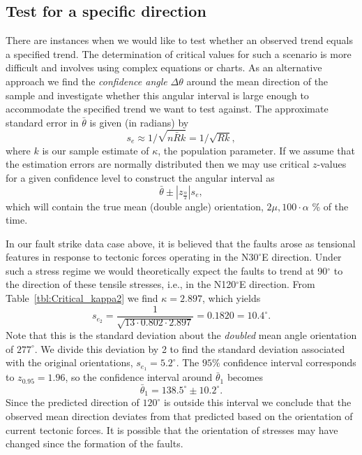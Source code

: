 \subsection{Test for a specific direction}

	There are instances when we would like to test whether an observed trend equals a 
specified trend.  The determination of critical values for such a scenario is more difficult and involves 
using complex equations or charts.  As an alternative approach we find the \emph{confidence angle} $\Delta \theta$ around
the mean direction of the sample and investigate whether this angular interval is large enough to accommodate the specified trend
we want to test against.  The approximate standard error in $\bar{\theta}$ is given (in radians) by
\begin{equation}
s_e \approx 1/\sqrt{n \bar{R}k} = 1/\sqrt{Rk},
\end{equation}
where $k$ is our sample estimate of $\kappa$, the population parameter.  If we assume that the estimation errors are normally distributed
then we may use critical $z$-values for a given confidence level to construct the angular interval as
\begin{equation}
\bar{\theta} \pm \left | z_{\frac{\alpha}{2}} \right | s_e,
\end{equation}	 
which will contain the true mean (double angle) orientation, $2\mu, 100\cdot\alpha$ \% of the time.
\begin{example}
In our fault strike data case above,
it is believed that the faults arose as tensional features in response to tectonic forces operating in the N$30^{\circ}$E
direction.  Under such a stress regime we would theoretically expect the faults to trend at 90$^{\circ}$ to the direction of these tensile
stresses, i.e., in the N120$^{\circ}$E direction.  From Table~\ref{tbl:Critical_kappa2} we find $\kappa =2.897$, which yields
\begin{equation}
s_{e_2} = \frac{1}{ \sqrt{13 \cdot 0.802 \cdot  2.897}} = 0.1820 = 10.4^{\circ}.
\end{equation}
Note that this is the standard deviation about the \emph{doubled} mean angle orientation of $277^{\circ}$.  We divide this deviation by
2 to find the standard deviation associated with the original orientations, $s_{e_1} = 5.2^{\circ}$.  The 
$95 \%$ confidence interval corresponds to $z_{0.95} = 1.96$, so the confidence interval around $\bar{\theta}_1$ becomes	 
\begin{equation}
\bar{\theta}_1 = 138.5^{\circ} \pm 10.2^{\circ}.
\end{equation}
Since the predicted direction of $120^{\circ}$ is outside this interval we conclude that the observed
mean direction deviates from that predicted based on the orientation of current tectonic forces.  It is possible that the
orientation of stresses may have changed since the formation of the faults.
\end{example}

